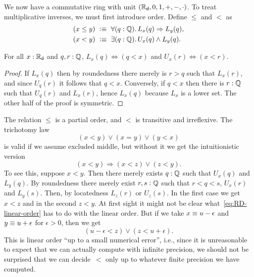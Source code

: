 We now have a commutative ring with unit $(\mathbb{R}_\mathsf{d}, 0, 1, {+}, {-}, {\cdot})$. To treat
multiplicative inverses, we must first introduce order. Define $\leq$ and $<$ as
%
\begin{align*}
  (x \leq y) &\ \defeq \ \fall{q : \Q} L_x(q) \Rightarrow L_y(q), \\
  (x < y)    &\ \defeq \ \exis{q : \Q} U_x(q) \land L_y(q).
\end{align*}

\begin{lem} \label{dedekind-in-cut-as-le}
  For all $x : \mathbb{R}_\mathsf{d}$ and $q, r : \mathbb{Q}$, $L_x(q) \Leftrightarrow (q < x)$ and $U_x(r)
  \Leftrightarrow (x < r)$.
\end{lem}

\begin{proof}
  If $L_x(q)$ then by roundedness there merely is $r > q$ such that $L_x(r)$, and since
  $U_q(r)$ it follows that $q < x$. Conversely, if $q < x$ then there is $r : \mathbb{Q}$ such
  that $U_q(r)$ and $L_x(r)$, hence $L_x(q)$ because $L_x$ is a lower set. The other half
  of the proof is symmetric.
\end{proof}

The relation $\leq$ is a partial order, and $<$ is transitive and irreflexive. The
trichotomy law
%
\begin{equation*}
  (x < y) \lor (x = y) \lor (y < x)
\end{equation*}
%
is valid if we assume excluded middle, but without it we get the intuitionistic version
%
\begin{equation} \label{eq:RD-linear-order}
  (x < y) \Rightarrow (x < z) \lor (z < y).
\end{equation}
%
To see this, suppose $x < y$. Then there merely exists $q : \mathbb{Q}$ such that $U_x(q)$ and
$L_y(q)$. By roundedness there merely exist $r, s : \mathbb{Q}$ such that $r < q < s$, $U_x(r)$
and $L_y(s)$. Then, by locatedness $L_z(r)$ or $U_z(s)$. In the first case we get $x < z$
and in the second $z < y$. At first sight it might not be clear
what~\eqref{eq:RD-linear-order} has to do with the linear order. But if we take $x \equiv
u - \epsilon$ and $y \equiv u + \epsilon$ for $\epsilon > 0$, then we get
%
\begin{equation*}
  (u - \epsilon < z) \lor (z < u + \epsilon).
\end{equation*}
%
This is linear order ``up to a small numerical error'', i.e., since it is unreasonable to
expect that we can actually compute with infinite precision, we should not be surprised
that we can decide~$<$ only up to whatever finite precision we have computed.

